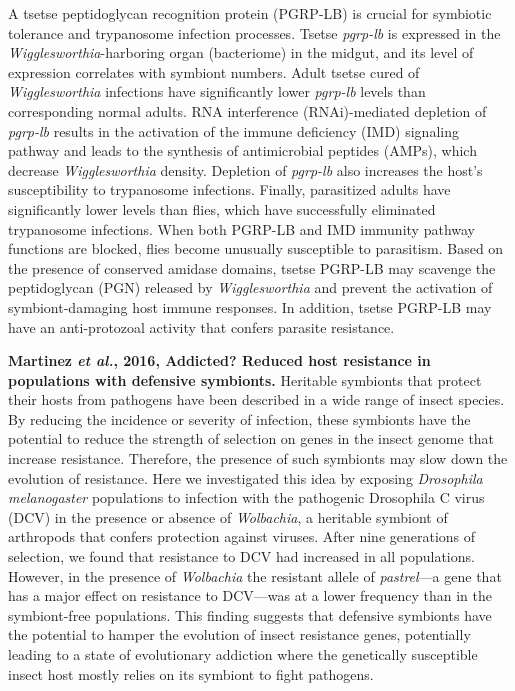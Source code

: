 \documentclass[11pt]{article}
\begin{document}
\begin{sloppypar}
A tsetse peptidoglycan recognition protein (PGRP-LB) is crucial for symbiotic tolerance and trypanosome infection processes. 
Tsetse \textit{pgrp-lb} is expressed in the \textit{Wigglesworthia}-harboring organ (bacteriome) in the midgut, and its level of expression correlates with symbiont numbers. 
Adult tsetse cured of \textit{Wigglesworthia} infections have significantly lower \textit{pgrp-lb} levels than corresponding normal adults. 
RNA interference (RNAi)-mediated depletion of \textit{pgrp-lb} results in the activation of the immune deficiency (IMD) signaling pathway and leads to the synthesis of antimicrobial peptides (AMPs), which decrease \textit{Wigglesworthia} density. 
Depletion of \textit{pgrp-lb} also increases the host's susceptibility to trypanosome infections. 
Finally, parasitized adults have significantly lower  levels than flies, which have successfully eliminated trypanosome infections. 
When both PGRP-LB and IMD immunity pathway functions are blocked, flies become unusually susceptible to parasitism. 
Based on the presence of conserved amidase domains, tsetse PGRP-LB may scavenge the peptidoglycan (PGN) released by \textit{Wigglesworthia} and prevent the activation of symbiont-damaging host immune responses. 
In addition, tsetse PGRP-LB may have an anti-protozoal activity that confers parasite resistance. 
\par
\textbf{Martinez \textit{et al.}, 2016, Addicted? Reduced host resistance in populations with defensive symbionts.} \newline
Heritable symbionts that protect their hosts from pathogens have been described in a wide range of insect species. 
By reducing the incidence or severity of infection, these symbionts have the potential to reduce the strength of selection on genes in the insect genome that increase resistance. 
Therefore, the presence of such symbionts may slow down the evolution of resistance. 
Here we investigated this idea by exposing \textit{Drosophila melanogaster} populations to infection with the pathogenic Drosophila C virus (DCV) in the presence or absence of \textit{Wolbachia}, a heritable symbiont of arthropods that confers protection against viruses. 
After nine generations of selection, we found that resistance to DCV had increased in all populations. 
However, in the presence of \textit{Wolbachia} the resistant allele of \textit{pastrel}—a gene that has a major effect on resistance to DCV—was at a lower frequency than in the symbiont-free populations. 
This finding suggests that defensive symbionts have the potential to hamper the evolution of insect resistance genes, potentially leading to a state of evolutionary addiction where the genetically susceptible insect host mostly relies on its symbiont to fight pathogens.  

\end{sloppypar}
\end{document}
